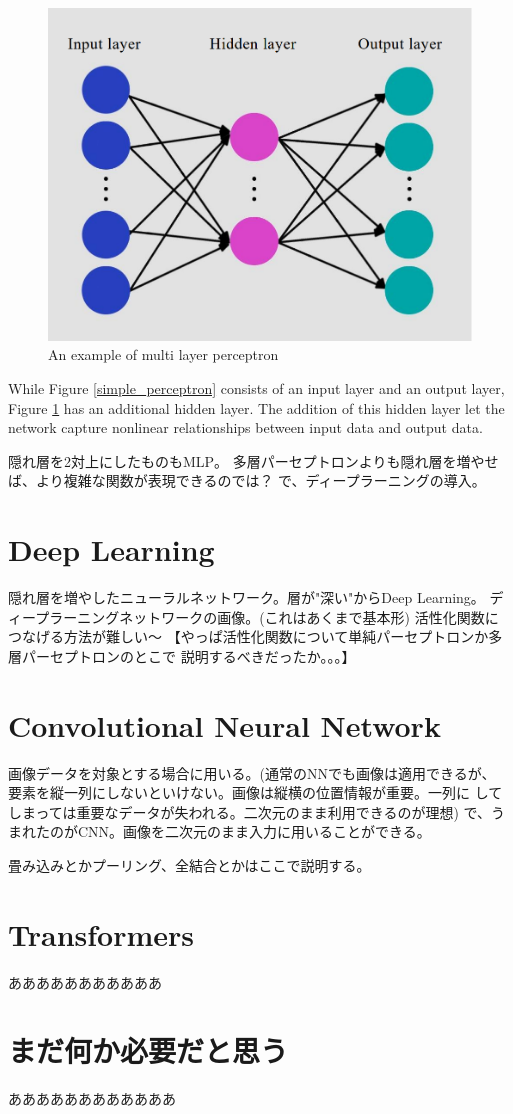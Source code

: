 \begin{figure}[h]
  \centering
  \includegraphics[width=130truemm]{resources/2_background/multi_layer_perceptron.png}
  \caption{
    An example of multi layer perceptron
  }
  \label{multilayer_perceptron}
\end{figure}
While Figure \ref{simple_perceptron} consists of an input layer and an 
output layer, Figure \ref{multilayer_perceptron} has an additional hidden 
layer. The addition of this hidden layer let the network capture nonlinear
relationships between input data and output data.

隠れ層を2対上にしたものもMLP。
多層パーセプトロンよりも隠れ層を増やせば、より複雑な関数が表現できるのでは？
で、ディープラーニングの導入。

\cite{dastres:hal-03349542}

\section{Deep Learning}
隠れ層を増やしたニューラルネットワーク。層が"深い"からDeep Learning。
ディープラーニングネットワークの画像。(これはあくまで基本形)
活性化関数につなげる方法が難しい～
【やっぱ活性化関数について単純パーセプトロンか多層パーセプトロンのとこで
説明するべきだったか。。。】

\section{Convolutional Neural Network}
画像データを対象とする場合に用いる。(通常のNNでも画像は適用できるが、
要素を縦一列にしないといけない。画像は縦横の位置情報が重要。一列に
してしまっては重要なデータが失われる。二次元のまま利用できるのが理想)
で、うまれたのがCNN。画像を二次元のまま入力に用いることができる。

畳み込みとかプーリング、全結合とかはここで説明する。

\section{Transformers}
あああああああああああ

\section{まだ何か必要だと思う} 
ああああああああああああ